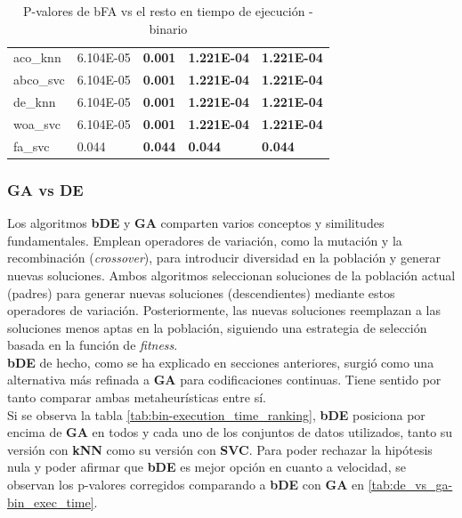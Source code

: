 \begin{table}[htp]
\begin{tabular}{lllll}
        aco\_knn  & 6.104E-05 & \textbf{0.001} & \textbf{1.221E-04} & \textbf{1.221E-04} \\
        abco\_svc & 6.104E-05 & \textbf{0.001} & \textbf{1.221E-04} & \textbf{1.221E-04} \\
        de\_knn   & 6.104E-05 & \textbf{0.001} & \textbf{1.221E-04} & \textbf{1.221E-04} \\
        woa\_svc  & 6.104E-05 & \textbf{0.001} & \textbf{1.221E-04} & \textbf{1.221E-04} \\
        fa\_svc   & 0.044     & \textbf{0.044} & \textbf{0.044}     & \textbf{0.044}     \\
        \bottomrule
    \end{tabular}
    \caption{P-valores de bFA vs el resto en tiempo de ejecución - binario}
    \label{tab:fa_vs_rest-bin_exec_time}
\end{table}

\subsubsection{GA vs DE}
Los algoritmos \textbf{bDE} y \textbf{GA} comparten varios conceptos y similitudes fundamentales. Emplean operadores de variación, como la mutación y la recombinación (\textit{crossover}), para introducir diversidad en la población y generar nuevas soluciones. Ambos algoritmos seleccionan soluciones de la población actual (padres) para generar nuevas soluciones (descendientes) mediante estos operadores de variación. Posteriormente, las nuevas soluciones reemplazan a las soluciones menos aptas en la población, siguiendo una estrategia de selección basada en la función de \textit{fitness}.\\[6pt]
\textbf{bDE} de hecho, como se ha explicado en secciones anteriores, surgió como una alternativa más refinada a \textbf{GA} para codificaciones continuas. Tiene sentido por tanto comparar ambas metaheurísticas entre sí.\\[6pt]

Si se observa la tabla \ref{tab:bin-execution_time_ranking}, \textbf{bDE} posiciona por encima de \textbf{GA} en todos y cada uno de los conjuntos de datos utilizados, tanto su versión con \textbf{kNN} como su versión con \textbf{SVC}. Para poder rechazar la hipótesis nula y poder afirmar que \textbf{bDE} es mejor opción en cuanto a velocidad, se observan los p-valores corregidos comparando a \textbf{bDE} con \textbf{GA} en \ref{tab:de_vs_ga-bin_exec_time}.


